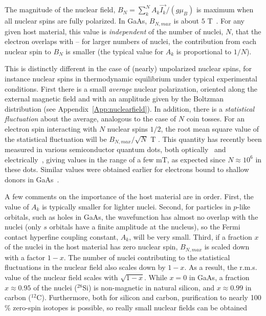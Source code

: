 \documentclass[rmp,twocolumn,aps]{revtex4}
\begin{document}
The magnitude of the nuclear field, $B_N = \sum_k^N A_k \vec{I_k} / (g \mu_B)$ is maximum when all nuclear spins are fully polarized. In GaAs, $B_{N,max}$ is about $5$ T~\cite{paget77}. For any given host material, this value is \emph{independent} of the number of nuclei, $N$, that the electron overlaps with -- for larger numbers of nuclei, the contribution from each nuclear spin to $B_N$ is smaller (the typical value for $A_k$ is proportional to $1/N$).

This is distinctly different in the case of (nearly) unpolarized nuclear spins, for instance nuclear spins in thermodynamic equilibrium under typical experimental conditions. First there is a small \emph{average} nuclear polarization, oriented along the external magnetic field and with an amplitude given by the Boltzman distribution (see Appendix~\ref{App:nuclearfield}). In addition, there is a \emph{statistical fluctuation} about the average, analogous to the case of $N$ coin tosses. For an electron spin interacting with $N$ nuclear spins $1/2$, the root mean square value of the statistical fluctuation will be $B_{N,max} /\sqrt{N}$ T \cite{merkulov02,khaetskii02}. This quantity has recently been measured in various semiconductor quantum dots, both optically~\cite{braun05,dutt05} and electrically~\cite{johnson05,koppens05}, giving values in the range
of a few mT, as expected since $N\approx 10^6$ in these dots. Similar values were obtained earlier for electrons bound to shallow donors in GaAs~\cite{dzhioev02}.

A few comments on the importance of the host material are in order. 
First, the value of $A_k$ is typically smaller for lighter nuclei. Second, for particles in $p$-like orbitals, such as holes in GaAs, the wavefunction has almost no overlap with the nuclei (only $s$ orbitals have a finite amplitude at the nucleus), so the Fermi contact hyperfine coupling constant, $A_k$, will be very small. Third, if a fraction $x$ of the nuclei in the host material has zero nuclear spin, $B_{N,max}$ is scaled down with a factor $1-x$. The number of nuclei contributing to the statistical fluctuations in the nuclear field also scales down by $1-x$. As a result, the r.m.s. value of the nuclear field scales with $\sqrt{1-x}$. While $x=0$ in GaAs, a fraction $x\approx0.95$ of the nuclei ($^{28}$Si) is non-magnetic in natural silicon, and $x\approx0.99$ in carbon ($^{12}$C). Furthermore, both for silicon and carbon, purification to nearly 100$\%$ zero-spin isotopes is possible, so really small nuclear fields can be obtained
\end{document}
